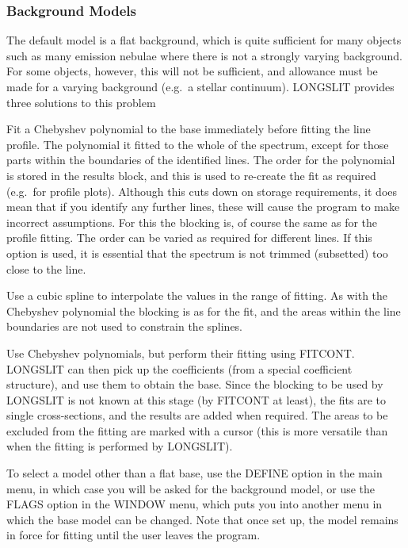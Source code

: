 \subsubsection{Background Models}

The default model is a flat background, which is quite sufficient for
many objects such as many emission nebulae where there is not a strongly
varying background.
For some objects, however, this will not be sufficient, and allowance
must be made for a varying background (e.g.\ a stellar continuum).
LONGSLIT provides three solutions to this problem
\begin{list}{\bf{} ---}{}
\item
Fit a Chebyshev polynomial to the base immediately before fitting the
line profile.
The polynomial it fitted to the whole of the spectrum, except for those
parts within the boundaries of the identified lines.
The order for the polynomial is stored in the results block, and this is
used to re-create the fit as required (e.g.\ for profile plots).
Although this cuts down on storage requirements, it does mean that if
you identify any further lines, these will cause the program to make
incorrect assumptions.
For this the blocking is, of course the same as for the profile
fitting.
The order can be varied as required for different lines.
If this option is used, it is essential that the spectrum is not trimmed
(subsetted) too close to the line.
\item
Use a cubic spline to interpolate the values in the range of fitting.
As with the Chebyshev polynomial the blocking is as for the fit, and the
areas within the line boundaries are not used to constrain the splines.
\item
Use Chebyshev polynomials, but perform their fitting using FITCONT.
LONGSLIT can then pick up the coefficients (from a special coefficient
structure), and use them to obtain the base.
Since the blocking to be used by LONGSLIT is not known at this stage (by
FITCONT at least), the fits are to single cross-sections, and the
results are added when required.
The areas to be excluded from the fitting are marked with a cursor (this
is more versatile than when the fitting is performed by LONGSLIT).
\end{list}
To select a model other than a flat base, use the DEFINE option in the
main menu, in which case you will be asked for the background model, or
use the FLAGS option in the WINDOW menu, which puts you into another
menu in which the base model can be changed.
Note that once set up, the model remains in force for fitting until the
user leaves the program.

